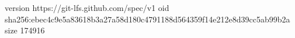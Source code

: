 version https://git-lfs.github.com/spec/v1
oid sha256:ebec4c9e5a83618b3a27a58d180c4791188d564359f14e212e8d39cc5ab99b2a
size 174916
